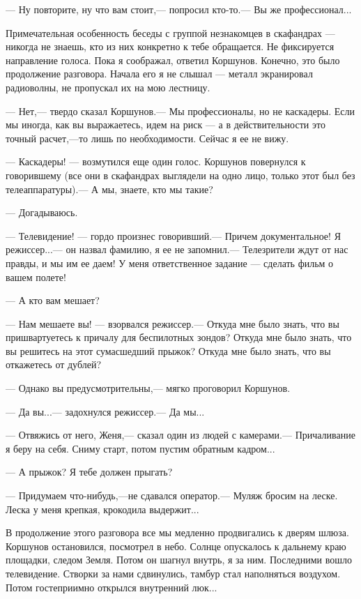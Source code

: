 \documentclass[11pt,a4paper,oneside]{article}
\begin{document}
— Ну повторите, ну что вам стоит,— попросил кто-то.— Вы же профессионал...

Примечательная особенность беседы с группой незнакомцев в скафандрах — никогда не знаешь, кто из них конкретно к тебе обращается. Не фиксируется направление голоса. Пока я соображал, ответил Коршунов. Конечно, это было продолжение разговора. Начала его я не слышал — металл экранировал радиоволны, не пропускал их на мою лестницу.

— Нет,— твердо сказал Коршунов.— Мы профессионалы, но не каскадеры. Если мы иногда, как вы выражаетесь, идем на риск — а в действительности это точный расчет,—то лишь по необходимости. Сейчас я ее не вижу.

— Каскадеры! — возмутился еще один голос. Коршунов повернулся к говорившему (все они в скафандрах выглядели на одно лицо, только этот был без телеаппаратуры).— А мы, знаете, кто мы такие?

— Догадываюсь.

— Телевидение! — гордо произнес говоривший.— Причем документальное! Я режиссер...— он назвал фамилию, я ее не запомнил.— Телезрители ждут от нас правды, и мы им ее даем! У меня ответственное задание — сделать фильм о вашем полете!

— А кто вам мешает?

— Нам мешаете вы! — взорвался режиссер.— Откуда мне было знать, что вы пришвартуетесь к причалу для беспилотных зондов? Откуда мне было знать, что вы решитесь на этот сумасшедший прыжок? Откуда мне было знать, что вы откажетесь от дублей?

— Однако вы предусмотрительны,— мягко проговорил Коршунов.

— Да вы...— задохнулся режиссер.— Да мы...

— Отвяжись от него, Женя,— сказал один из людей с камерами.— Причаливание я беру на себя. Сниму старт, потом пустим обратным кадром...

— А прыжок? Я тебе должен прыгать?

— Придумаем что-нибудь,—не сдавался оператор.— Муляж бросим на леске. Леска у меня крепкая, крокодила выдержит...

В продолжение этого разговора все мы медленно продвигались к дверям шлюза. Коршунов остановился, посмотрел в небо. Солнце опускалось к дальнему краю площадки, следом Земля. Потом он шагнул внутрь, я за ним. Последними вошло телевидение. Створки за нами сдвинулись, тамбур стал наполняться воздухом. Потом гостеприимно открылся внутренний люк...
\end{document}
